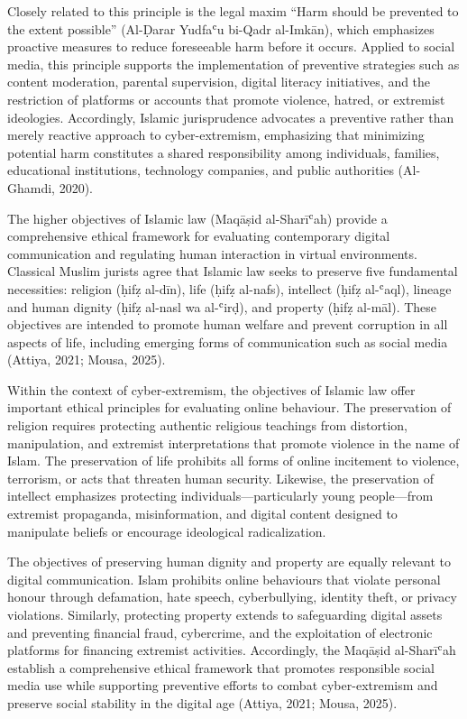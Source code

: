\documentclass[10pt]{NSP1}
\begin{document}
Closely related to this principle is the legal maxim “Harm should be prevented to the extent possible” (Al-Ḍarar Yudfaʿu bi-Qadr al-Imkān), which emphasizes proactive measures to reduce foreseeable harm before it occurs. Applied to social media, this principle supports the implementation of preventive strategies such as content moderation, parental supervision, digital literacy initiatives, and the restriction of platforms or accounts that promote violence, hatred, or extremist ideologies. Accordingly, Islamic jurisprudence advocates a preventive rather than merely reactive approach to cyber-extremism, emphasizing that minimizing potential harm constitutes a shared responsibility among individuals, families, educational institutions, technology companies, and public authorities (Al-Ghamdi, 2020).

\par\medskip{}\smallskip

The higher objectives of Islamic law (Maqāṣid al-Sharīʿah) provide a comprehensive ethical framework for evaluating contemporary digital communication and regulating human interaction in virtual environments. Classical Muslim jurists agree that Islamic law seeks to preserve five fundamental necessities: religion (ḥifẓ al-dīn), life (ḥifẓ al-nafs), intellect (ḥifẓ al-ʿaql), lineage and human dignity (ḥifẓ al-nasl wa al-ʿirḍ), and property (ḥifẓ al-māl). These objectives are intended to promote human welfare and prevent corruption in all aspects of life, including emerging forms of communication such as social media (Attiya, 2021; Mousa, 2025).

Within the context of cyber-extremism, the objectives of Islamic law offer important ethical principles for evaluating online behaviour. The preservation of religion requires protecting authentic religious teachings from distortion, manipulation, and extremist interpretations that promote violence in the name of Islam. The preservation of life prohibits all forms of online incitement to violence, terrorism, or acts that threaten human security. Likewise, the preservation of intellect emphasizes protecting individuals—particularly young people—from extremist propaganda, misinformation, and digital content designed to manipulate beliefs or encourage ideological radicalization.

The objectives of preserving human dignity and property are equally relevant to digital communication. Islam prohibits online behaviours that violate personal honour through defamation, hate speech, cyberbullying, identity theft, or privacy violations. Similarly, protecting property extends to safeguarding digital assets and preventing financial fraud, cybercrime, and the exploitation of electronic platforms for financing extremist activities. Accordingly, the Maqāṣid al-Sharīʿah establish a comprehensive ethical framework that promotes responsible social media use while supporting preventive efforts to combat cyber-extremism and preserve social stability in the digital age (Attiya, 2021; Mousa, 2025).
\end{document}
